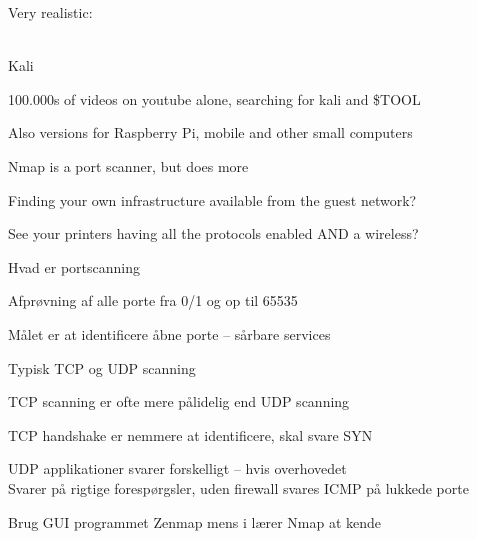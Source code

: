 \documentclass[Screen16to9,17pt]{foils}
\begin{document}

Very realistic:\\
\\




\begin{list1}
\item  Kali 
\item 100.000s of videos on youtube alone, searching for kali and \$TOOL
\item Also versions for Raspberry Pi, mobile and other small computers
\end{list1}



\begin{list2}
\item Nmap is a port scanner, but does more
\item Finding your own infrastructure available from the guest network?
\item See your printers having all the protocols enabled AND a wireless?
\end{list2}



\begin{list1}
\item Hvad er portscanning
\item Afprøvning af alle porte fra 0/1 og op til 65535
\item Målet er at identificere åbne porte -- sårbare services
\item Typisk TCP og UDP scanning
\item TCP scanning er ofte mere pålidelig end UDP scanning
\item TCP handshake er nemmere at identificere, skal svare SYN
\item UDP applikationer svarer forskelligt -- hvis overhovedet\\
Svarer på rigtige forespørgsler, uden firewall svares ICMP på lukkede porte
\item Brug GUI programmet Zenmap mens i lærer Nmap at kende
\end{list1}
\end{document}
